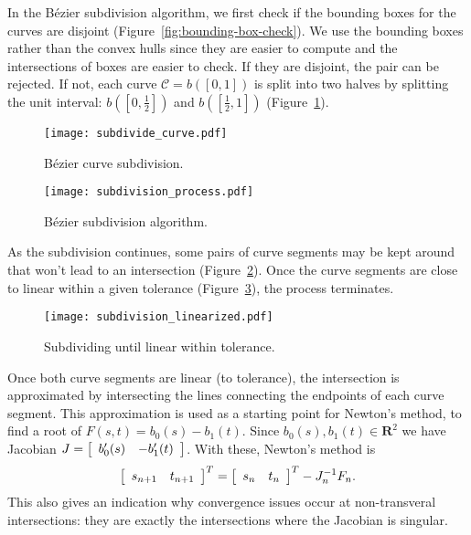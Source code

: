 \documentclass[oneside, reqno]{amsart}
\theoremstyle{definition}
\newcommand{\reals}{\mathbf{R}}
\begin{document}
In the B\'{e}zier subdivision algorithm, we first check if the
bounding boxes for the curves are disjoint
(Figure~\ref{fig:bounding-box-check}).
We use the bounding boxes
rather than the convex hulls since they are easier to compute and
the intersections of boxes are easier to check.
If they are disjoint, the pair can be rejected. If not, each curve
\(\mathcal{C} = b\left(\left[0, 1\right]\right)\) is split into two halves
by splitting the unit interval: \(b\left(\left[0, \frac{1}{2}\right]\right)\)
and \(b\left(\left[\frac{1}{2}, 1\right]\right)\)
(Figure~\ref{fig:bezier-curve-subdivision}).

\begin{figure}
  \texttt{[image: subdivide\_curve.pdf]}
  \centering
  \captionsetup{width=.75\linewidth}
  \caption{B\'{e}zier curve subdivision.}
  \label{fig:bezier-curve-subdivision}
\end{figure}

\begin{figure}
  \texttt{[image: subdivision\_process.pdf]}
  \centering
  \captionsetup{width=.75\linewidth}
  \caption{B\'{e}zier subdivision algorithm.}
  \label{fig:bezier-subdivision-process}
\end{figure}

As the subdivision continues,
some pairs of curve segments may be kept around that won't lead to an
intersection (Figure~\ref{fig:bezier-subdivision-process}).
Once the curve segments are close to linear within a given tolerance
(Figure~\ref{fig:bezier-subdivision-linearized}), the process
terminates.

\begin{figure}
  \texttt{[image: subdivision\_linearized.pdf]}
  \centering
  \captionsetup{width=.75\linewidth}
  \caption{Subdividing until linear within tolerance.}
  \label{fig:bezier-subdivision-linearized}
\end{figure}

Once both curve segments are linear (to tolerance), the intersection is
approximated by intersecting the lines connecting the endpoints of each
curve segment. This approximation is used as a starting point for Newton's
method, to find a root of \(F(s, t) = b_0(s) - b_1(t)\). Since
\(b_0(s), b_1(t) \in \reals^2\) we have Jacobian \(J =
\left[ \begin{array}{c c} b_0'(s) & -b_1'(t) \end{array}\right]\).
With these, Newton's method is
\begin{equation}
\left[ \begin{array}{c c} s_{n + 1} & t_{n + 1} \end{array}\right]^T =
\left[ \begin{array}{c c} s_n & t_n \end{array}\right]^T -
J_n^{-1} F_n.
\end{equation}
This also gives an indication why convergence issues occur at non-transveral
intersections: they are exactly the intersections where the Jacobian is
singular.
\end{document}
